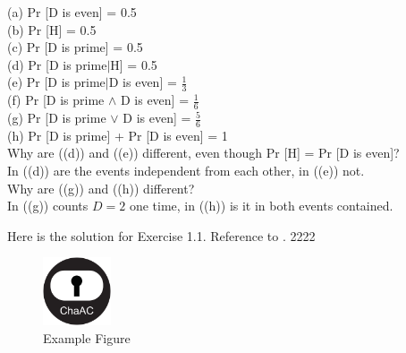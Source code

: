 \documentclass[12pt,a4paper]{article}
\begin{document}
(a) Pr [D is even] = 0.5\\
(b) Pr [H] = 0.5\\
(c) Pr [D is prime] = 0.5\\
(d) Pr [D is prime\(\vert\)H] = 0.5\\
(e) Pr [D is prime\(\vert\)D is even] = \(\frac{1}{3}\)\\
(f) Pr [D is prime \(\land \) D is even] = \(\frac{1}{6}\) \\
(g) Pr [D is prime \(\lor \) D is even] = \(\frac{5}{6}\) \\
(h) Pr [D is prime] + Pr [D is even] = 1\\
Why are ((d)) and ((e)) different, even though Pr [H] = Pr [D is even]?\\
\indent In ((d)) are the events independent from each other, in ((e)) not.\\
Why are ((g)) and ((h)) different?\\
\indent In ((g)) counts \(D=2\) one time, in ((h)) is it in both events contained.



 \exercise
 	Here is the solution for Exercise 1.1. Reference to .
 	2222

 	\begin{figure}[h]
 		\center
 		\includegraphics[width=2cm]{figures/logo}
 		\caption{Example Figure}
 		\label{fig:Example}	
 	\end{figure}

 \exercise

% 
\end{document}
